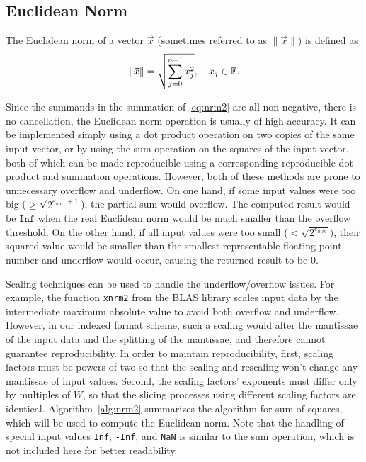 \subsection{Euclidean Norm}
  \label{sec:compositeops_nrm}
    The Euclidean norm of a vector $\vec{x}$ (sometimes referred to as $\|\vec{x}\|$) is defined as
    \begin{equation}
        \|\vec{x}\| = \sqrt{\sum_{j=0}^{n-1} x_j^2}, \quad x_j \in \mathbb{F}.
        \label{eq:nrm2}
    \end{equation}

    Since the summands in the summation of \eqref{eq:nrm2} are all non-negative,
    there is no cancellation, the Euclidean norm operation
    is usually of high accuracy.
    It can be implemented simply using a dot product operation on two copies of the same input vector,
    or by using the sum operation on the squares of the input vector,
    both of which can be made reproducible using a corresponding reproducible
    dot product and summation operations. However, both of these methods are prone to unnecessary overflow and underflow.
    On one hand, if some input values were too big ($\geq \sqrt{2^{e_{max}+1}}$),
    the partial sum would overflow. The computed result would
    be $\texttt{Inf}$ when the real Euclidean norm would be much smaller than the
    overflow threshold.
    On the other hand, if all input values were too small ($ < \sqrt{2^{e_{min}}}$),
    their squared value would be smaller than the smallest representable floating point number and 
    underflow would occur, causing the returned result to be 0.

    Scaling techniques can be used to handle the underflow/overflow issues.
    For example, the function \texttt{xnrm2} from the BLAS library \cite{BLAS}
    scales input data by the intermediate maximum absolute value
    to avoid both overflow and underflow.
    However, in our indexed format scheme, such a scaling would alter
    the mantissae of the input data and the splitting of the mantissae, and therefore
    cannot guarantee reproducibility.
    In order to maintain reproducibility, 
    first, scaling factors must be powers of two so that the scaling and rescaling
    won't change any mantissae of input values.
    Second, the scaling factors' exponents must differ only by multiples of $W$,
    so that the slicing processes using different scaling factors are identical.
    Algorithm~\ref{alg:nrm2} summarizes the algorithm for sum of squares,
    which will be used to compute the Euclidean norm.
    Note that the handling of special input values \texttt{Inf}, \texttt{-Inf}, and \texttt{NaN}
    is similar to the sum operation, which is not included here for better readability.

